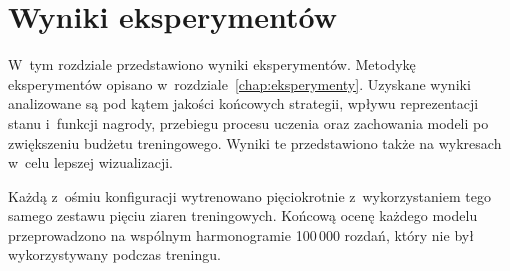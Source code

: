 \chapter{Wyniki eksperymentów}
\label{chap:wyniki}

W~tym rozdziale przedstawiono wyniki eksperymentów.
Metodykę eksperymentów opisano w~rozdziale~\ref{chap:eksperymenty}.
Uzyskane wyniki analizowane są pod kątem jakości końcowych strategii, wpływu reprezentacji stanu
i~funkcji nagrody, przebiegu procesu uczenia oraz zachowania modeli po
zwiększeniu budżetu treningowego. Wyniki te przedstawiono także na wykresach
w~celu lepszej wizualizacji.

Każdą z~ośmiu konfiguracji wytrenowano pięciokrotnie
z~wykorzystaniem tego samego zestawu pięciu ziaren treningowych.
Końcową ocenę każdego modelu przeprowadzono na wspólnym harmonogramie
100\,000 rozdań, który nie był wykorzystywany podczas treningu.










